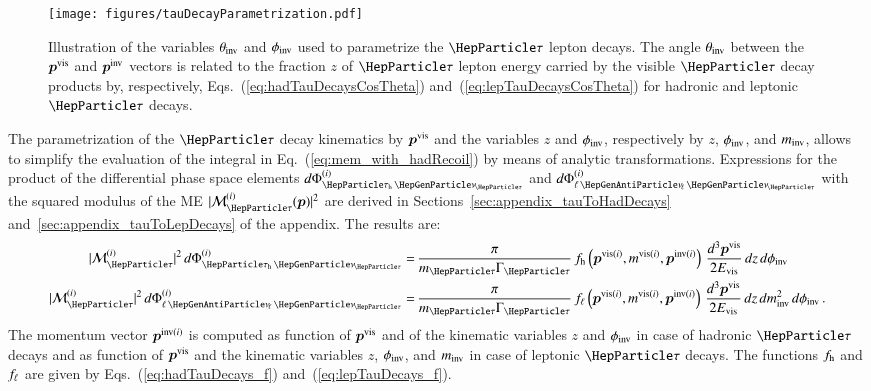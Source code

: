 \begin{figure}[h]
\begin{center}
\texttt{[image: figures/tauDecayParametrization.pdf]}
\end{center}
\caption{
  Illustration of the variables $\theta_{\textrm{inv}}$ and $\phi_{\textrm{inv}}$ used to parametrize the $\Pgt$ lepton decays.
  The angle $\theta_{\textrm{inv}}$ between the $\bm{p}^{\textrm{vis}}$ and $\bm{p}^{\textrm{inv}}$ vectors is related 
  to the fraction $z$ of $\Pgt$ lepton energy carried by the visible $\Pgt$ decay products
  by, respectively, Eqs.~(\ref{eq:hadTauDecaysCosTheta}) and~(\ref{eq:lepTauDecaysCosTheta}) for hadronic and leptonic $\Pgt$ decays.
}
\label{fig:tauDecayParametrization}
\end{figure} 

The parametrization of the $\Pgt$ decay kinematics by $\bm{p}^{\textrm{vis}}$
and the variables $z$ and $\phi_{\textrm{inv}}$, respectively by $z$, $\phi_{\textrm{inv}}$, and $m_{\textrm{inv}}$,
allows to simplify the evaluation of the integral in Eq.~(\ref{eq:mem_with_hadRecoil}) by means of analytic transformations.
Expressions for the product of the differential phase space elements
$d\Phi^{(i)}_{\tauhnu}$  and $d\Phi^{(i)}_{\ellnunu}$ with the squared
modulus of the ME $\vert \mathcal{M}^{(i)}_{\Pgt}(\bm{p}) \vert^{2}$ are derived in Sections~\ref{sec:appendix_tauToHadDecays} and~\ref{sec:appendix_tauToLepDecays} of the appendix.
The results are:
\begin{align}
\vert \mathcal{M}^{(i)}_{\Pgt} \vert^{2} \, d\Phi^{(i)}_{\tauhnu} 
 = & \, \frac{\pi}{m_{\Pgt}\Gamma_{\Pgt}} \,
 f_{\Phadron}\left(\bm{p}^{\vis(i)}, m^{\vis(i)},
   \bm{p}^{\inv(i)}\right) \, \frac{d^{3}\bm{p}^{\vis}}{2 E_{\vis}} \, dz \, d\phi_{\inv} \nonumber \\
\vert \mathcal{M}^{(i)}_{\Pgt} \vert^{2} \, d\Phi^{(i)}_{\ellnunu} 
 = & \, \frac{\pi}{m_{\Pgt}\Gamma_{\Pgt}} \, f_{\ell}\left(\bm{p}^{\vis(i)},
 m^{\vis(i)}, \bm{p}^{\inv(i)}\right) \, \frac{d^{3}\bm{p}^{\vis}}{2 E_{\vis}} \, dz \, dm^{2}_{\inv} \, d\phi_{\inv}
 \, .
\label{eq:PSint}
\end{align}
The momentum vector $\bm{p}^{\textrm{inv}(i)}$ is computed as function of
$\bm{p}^{\textrm{vis}}$ and of the kinematic variables $z$ and $\phi_{\textrm{inv}}$
in case of hadronic $\Pgt$ decays and as function of $\bm{p}^{\textrm{vis}}$
and the kinematic variables $z$, $\phi_{\textrm{inv}}$, and $m_{\textrm{inv}}$ in case
of leptonic $\Pgt$ decays.
The functions $f_{\textrm{h}}$ and $f_{\ell}$ are given by
Eqs.~(\ref{eq:hadTauDecays_f})
and~(\ref{eq:lepTauDecays_f}).

